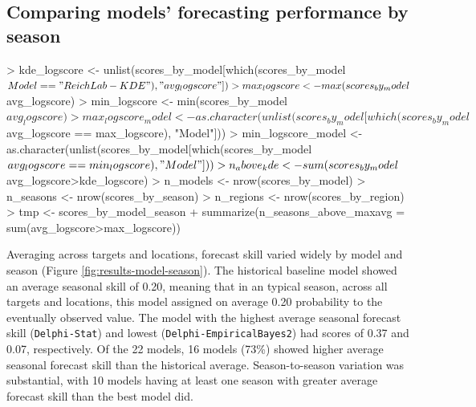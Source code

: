 \documentclass{article}
\begin{document}
\subsection{Comparing models' forecasting performance by season}
\begin{Schunk}
\begin{Sinput}
> kde_logscore <- unlist(scores_by_model[which(scores_by_model$Model=="ReichLab-KDE"), "avg_logscore"])
> max_logscore <- max(scores_by_model$avg_logscore)
> min_logscore <- min(scores_by_model$avg_logscore)
> max_logscore_model <- as.character(unlist(scores_by_model[which(scores_by_model$avg_logscore == max_logscore), "Model"]))
> min_logscore_model <- as.character(unlist(scores_by_model[which(scores_by_model$avg_logscore == min_logscore), "Model"]))
> n_above_kde <- sum(scores_by_model$avg_logscore>kde_logscore)
> n_models <- nrow(scores_by_model)
> n_seasons <- nrow(scores_by_season)
> n_regions <- nrow(scores_by_region)
> tmp <- scores_by_model_season %
+     summarize(n_seasons_above_maxavg = sum(avg_logscore>max_logscore)) 
\end{Sinput}
\end{Schunk}


Averaging across targets and locations, forecast skill varied widely by model and season (Figure \ref{fig:results-model-season}). 
The historical baseline model showed an average seasonal skill of 
0.20, 
meaning that in an typical season, across all targets and locations, this model assigned on average 
0.20 
probability to the eventually observed value. 
The model with the highest average seasonal forecast skill 
({\tt Delphi-Stat}) 
and lowest 
({\tt Delphi-EmpiricalBayes2}) 
had scores of 0.37 and 0.07, respectively. 
Of the 22 models, 16 models 
(73\%) 
showed higher average seasonal forecast skill than the historical average.
Season-to-season variation was substantial, with 
10 
models having at least one season with greater average forecast skill than the best model did.
\end{document}
